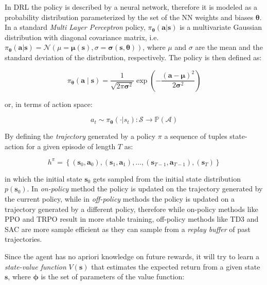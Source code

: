 In \ac{DRL} the policy is described by a neural network, therefore it is modeled as a probability distribution parameterized by the set of the \ac{NN} weights and biases $\boldsymbol{\theta}$. In a standard \textit{Multi Layer Perceptron} policy, $\pi _{\boldsymbol{\theta}}(\mathbf{a} | \mathbf{s})$ is a multivariate Gaussian distribution with diagonal covariance matrix, i.e. $\pi _{\boldsymbol{\theta}}(\mathbf{a} | \mathbf{s}) = \mathcal{N}(\mu = \boldsymbol{\mu}(\mathbf{s}), \sigma = \boldsymbol{\sigma}(\mathbf{s}, \boldsymbol{\theta}))$, where $\mu$ and $\sigma$ are the mean and the standard deviation of the distribution, respectively. The policy is then defined as:

\begin{equation}
    \pi _{\boldsymbol{\theta}}(\mathbf{a} \mid \mathbf{s}) = \frac{1}{\sqrt{2 \pi \boldsymbol{\sigma} ^2}} \exp \left(- \frac{(\mathbf{a} - \boldsymbol{\mu}) ^2}{2 \boldsymbol{\sigma} ^2} \right)
\end{equation}

or, in terms of action space:

\begin{equation}
    a _t \sim \pi _{\boldsymbol{\theta}}(\cdot | s_t): \mathcal{S} \rightarrow \mathbb{P}(\mathcal{A})
\end{equation}

By defining the \textit{trajectory} generated by a policy $\pi$ a sequence of tuples state-action for a given episode of length $T$ as:

\begin{equation}
    h ^{\pi} = \left\{ (\mathbf{s} _0, \mathbf{a} _0), (\mathbf{s} _1, \mathbf{a} _1), \dots, (\mathbf{s} _{T-1}, \mathbf{a} _{T-1}), (\mathbf{s} _T) \right\}
\end{equation}

in which the initial state $\mathbf{s} _0$ gets sampled from the initial state distribution $p(\mathbf{s} _0)$.
In \textit{on-policy} method the policy is updated on the trajectory generated by the current policy, while in \textit{off-policy} methods the policy is updated on a trajectory generated by a different policy, therefore while on-policy methods like \ac{PPO} and \ac{TRPO} result in more stable training, off-policy methods like \ac{TD3} and \ac{SAC} are more sample efficient as they can sample from a \textit{replay buffer} of past trajectories.

Since the agent has no apriori knowledge on future rewards, it will try to learn a \textit{state-value function} $V(\mathbf{s})$ that estimates the expected return from a given state $\mathbf{s}$, where $\boldsymbol{\phi}$ is the set of parameters of the value function:

